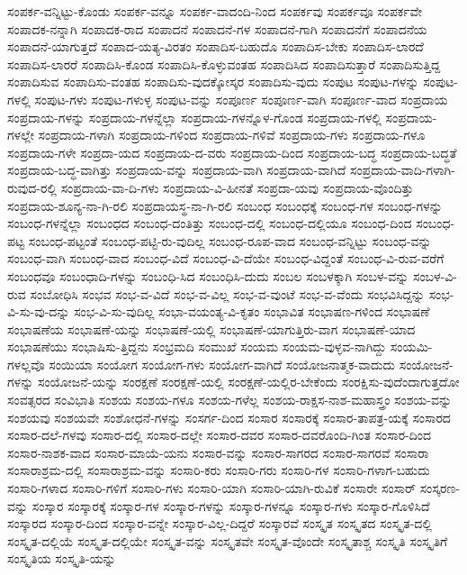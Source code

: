 {ಸಂಪರ್ಕ-ವನ್ನಿಟ್ಟು-ಕೊಂಡು
ಸಂಪರ್ಕ-ವನ್ನೂ
ಸಂಪರ್ಕ-ವಾದಂದಿ-ನಿಂದ
ಸಂಪರ್ಕವು
ಸಂಪರ್ಕವೂ
ಸಂಪರ್ಕವೇ
ಸಂಪಾದಕ-ನನ್ನಾಗಿ
ಸಂಪಾದಕ-ರಾದ
ಸಂಪಾದನೆ
ಸಂಪಾದನೆ-ಗಳ
ಸಂಪಾದನೆ-ಗಾಗಿ
ಸಂಪಾದನೆಗೆ
ಸಂಪಾದನೆಯ
ಸಂಪಾದನೆ-ಯಾಗುತ್ತದೆ
ಸಂಪಾದ-ಯತ್ಯ-ವಿರತಂ
ಸಂಪಾದಿಸ-ಬಹುದೊ
ಸಂಪಾದಿಸ-ಬೇಕು
ಸಂಪಾದಿಸ-ಲಾರದೆ
ಸಂಪಾದಿಸ-ಲಾರರೆ
ಸಂಪಾದಿಸಿ-ಕೊಂಡ
ಸಂಪಾದಿಸಿ-ಕೊಳ್ಳುವಂತಹ
ಸಂಪಾದಿಸಿದ
ಸಂಪಾದಿಸುತ್ತಾರೆ
ಸಂಪಾದಿಸುತ್ತಿದ್ದ
ಸಂಪಾದಿಸುವ
ಸಂಪಾದಿಸು-ವಂತಹ
ಸಂಪಾದಿಸು-ವುದಕ್ಕೋಸ್ಕರ
ಸಂಪಾದಿಸು-ವುದು
ಸಂಪುಟ
ಸಂಪುಟ-ಗಳನ್ನು
ಸಂಪುಟ-ಗಳಲ್ಲಿ
ಸಂಪುಟ-ಗಳು
ಸಂಪುಟ-ಗಳುಳ್ಳ
ಸಂಪುಟ-ವನ್ನು
ಸಂಪೂರ್ಣ
ಸಂಪೂರ್ಣ-ವಾಗಿ
ಸಂಪೂರ್ಣ-ವಾದ
ಸಂಪ್ರದಾಯ
ಸಂಪ್ರದಾಯ-ಗಳನ್ನು
ಸಂಪ್ರದಾಯ-ಗಳನ್ನೆಲ್ಲಾ
ಸಂಪ್ರದಾಯ-ಗಳನ್ನೊಳ-ಗೊಂಡ
ಸಂಪ್ರದಾಯ-ಗಳಲ್ಲಿ
ಸಂಪ್ರದಾಯ-ಗಳಲ್ಲೇ
ಸಂಪ್ರದಾಯ-ಗಳಾಗಿ
ಸಂಪ್ರದಾಯ-ಗಳಿಂದ
ಸಂಪ್ರದಾಯ-ಗಳಿವೆ
ಸಂಪ್ರದಾಯ-ಗಳು
ಸಂಪ್ರದಾಯ-ಗಳೂ
ಸಂಪ್ರದಾಯ-ಗಳೇ
ಸಂಪ್ರದಾ-ಯದ
ಸಂಪ್ರದಾಯ-ದ-ವರು
ಸಂಪ್ರದಾಯ-ದಿಂದ
ಸಂಪ್ರದಾಯ-ಬದ್ಧ
ಸಂಪ್ರದಾಯ-ಬದ್ಧತೆ
ಸಂಪ್ರದಾಯ-ಬದ್ಧ-ವಾಗಿತ್ತು
ಸಂಪ್ರದಾಯ-ವನ್ನು
ಸಂಪ್ರದಾಯ-ವಾಗಿ
ಸಂಪ್ರದಾಯ-ವಾಗಿದೆ
ಸಂಪ್ರದಾಯ-ವಾದಿ-ಗಳಾಗಿ-ರುವುದ-ರಲ್ಲಿ
ಸಂಪ್ರದಾಯ-ವಾ-ದಿ-ಗಳು
ಸಂಪ್ರದಾಯ-ವಿ-ಹೀನತೆ
ಸಂಪ್ರದಾ-ಯವು
ಸಂಪ್ರದಾಯ-ವೊಂದಿತ್ತು
ಸಂಪ್ರದಾಯ-ಶೂನ್ಯ-ನಾ-ಗಿ-ರಲಿ
ಸಂಪ್ರದಾಯಸ್ಥ-ನಾ-ಗಿ-ರಲಿ
ಸಂಬಂಧ
ಸಂಬಂಧಕ್ಕೆ
ಸಂಬಂಧ-ಗಳ
ಸಂಬಂಧ-ಗಳನ್ನು
ಸಂಬಂಧ-ಗಳನ್ನೆಲ್ಲಾ
ಸಂಬಂಧದ
ಸಂಬಂಧ-ದಂತಿತ್ತು
ಸಂಬಂಧ-ದಲ್ಲಿ
ಸಂಬಂಧ-ದಲ್ಲಿಯೂ
ಸಂಬಂಧ-ದಿಂದ
ಸಂಬಂಧ-ಪಟ್ಟ
ಸಂಬಂಧ-ಪಟ್ಟಂತೆ
ಸಂಬಂಧ-ಪಟ್ಟಿ-ರು-ವುದಿಲ್ಲ
ಸಂಬಂಧ-ರೂಪ-ವಾದ
ಸಂಬಂಧ-ವನ್ನಿಟ್ಟು
ಸಂಬಂಧ-ವನ್ನು
ಸಂಬಂಧ-ವಾಗಿ
ಸಂಬಂಧ-ವಾದ
ಸಂಬಂಧ-ವಿದೆ
ಸಂಬಂಧ-ವಿ-ದೆಯೇ
ಸಂಬಂಧ-ವಿದ್ದಂತೆ
ಸಂಬಂಧ-ವಿ-ರುವ-ವರೆಗೆ
ಸಂಬಂಧವೂ
ಸಂಬಂಧಾದಿ-ಗಳನ್ನು
ಸಂಬಂಧಿ-ಸಿದ
ಸಂಬಂಧಿಸಿ-ದುದು
ಸಂಬಲ
ಸಂಬಳಕ್ಕಾಗಿ
ಸಂಬಳ-ವನ್ನು
ಸಂಬಳ-ವಿ-ರುವ
ಸಂಬೋಧಿಸಿ
ಸಂಭವ
ಸಂಭ-ವ-ವಿದೆ
ಸಂಭ-ವ-ವಿಲ್ಲ
ಸಂಭ-ವ-ವುಂಟೆ
ಸಂಭ-ವ-ವೆಂದು
ಸಂಭವಿಸಿದ್ದನ್ನು
ಸಂಭ-ವಿ-ಸು-ವು-ದನ್ನು
ಸಂಭ-ವಿ-ಸು-ವುದಿಲ್ಲ
ಸಂಭಾ-ವಯಂತ್ಯ-ವಿ-ಕೃತಂ
ಸಂಭಾವಿತ
ಸಂಭಾಷಣ-ಗಳಿಂದ
ಸಂಭಾಷಣೆ
ಸಂಭಾಷಣೆಯ
ಸಂಭಾಷಣೆ-ಯನ್ನು
ಸಂಭಾಷಣೆ-ಯಲ್ಲಿ
ಸಂಭಾಷಣೆ-ಯಾಗುತ್ತಿರು-ವಾಗ
ಸಂಭಾಷಣೆ-ಯಾದ
ಸಂಭಾಷಣೆಯು
ಸಂಭಾಷಿಸು-ತ್ತಿದ್ದನು
ಸಂಭ್ರಮದಿ
ಸಂಮುಖೆ
ಸಂಯಮ
ಸಂಯಮ-ವುಳ್ಳವ-ನಾಗಿದ್ದು
ಸಂಯಮಿ-ಗಳಲ್ಲವೊ
ಸಂಯಿಯಾ
ಸಂಯೋಗ
ಸಂಯೋಗ-ಗಳು
ಸಂಯೋಗ-ವಾಗಿದೆ
ಸಂಯೋಜನಾತ್ಮಕ-ವಾದುದು
ಸಂಯೋಜನೆ-ಗಳನ್ನು
ಸಂಯೋಜನೆ-ಯನ್ನು
ಸಂರಕ್ಷಣೆ
ಸಂರಕ್ಷಣೆ-ಯಲ್ಲಿ
ಸಂರಕ್ಷಣೆ-ಯಲ್ಲಿರ-ಬೇಕೆಂದು
ಸಂರಕ್ಷಿಸು-ವುದೆಂದಾಗುತ್ತದೋ
ಸಂವತ್ಸರದ
ಸಂವಿಭಾತಿ
ಸಂಶಯ
ಸಂಶಯ-ಗಳೂ
ಸಂಶಯ-ಗಳೆಲ್ಲ
ಸಂಶಯ-ರಾಕ್ಷಸ-ನಾಶ-ಮಹಾಸ್ತ್ರಂ
ಸಂಶಯ-ವನ್ನು
ಸಂಶಯವು
ಸಂಶಯವೇ
ಸಂಶೋಧನೆ-ಗಳನ್ನು
ಸಂಸರ್ಗ-ದಿಂದ
ಸಂಸಾರ
ಸಂಸಾರಕ್ಕೆ
ಸಂಸಾರ-ತಾಪತ್ರ-ಯಕ್ಕೆ
ಸಂಸಾರದ
ಸಂಸಾರ-ದಲೆ-ಗಳವು
ಸಂಸಾರ-ದಲ್ಲಿ
ಸಂಸಾರ-ದಲ್ಲೇ
ಸಂಸಾರ-ದವರ
ಸಂಸಾರ-ದವರೊಂದಿ-ಗಿಂತ
ಸಂಸಾರ-ದಿಂದ
ಸಂಸಾರ-ನಾಶಕ-ವಾದ
ಸಂಸಾರ-ಮಾಯೆ-ಯನು
ಸಂಸಾರ-ವನ್ನು
ಸಂಸಾರ-ಸಾಗರದ
ಸಂಸಾರ-ಸಾಗರವೆ
ಸಂಸಾರಾ
ಸಂಸಾರಾಶ್ರಮ-ದಲ್ಲಿ
ಸಂಸಾರಾಶ್ರಮ-ವನ್ನು
ಸಂಸಾರಿ-ಕರು
ಸಂಸಾರಿ-ಗರು
ಸಂಸಾರಿ-ಗಳ
ಸಂಸಾರಿ-ಗಳಾಗ-ಬಹುದು
ಸಂಸಾರಿ-ಗಳಾದ
ಸಂಸಾರಿ-ಗಳಿಗೆ
ಸಂಸಾರಿ-ಗಳು
ಸಂಸಾರಿ-ಯಾಗಿ
ಸಂಸಾರಿ-ಯಾಗಿ-ರುವಿಕೆ
ಸಂಸಾರೇ
ಸಂಸಾರ್
ಸಂಸ್ಕರಣ-ವನ್ನು
ಸಂಸ್ಕಾರ
ಸಂಸ್ಕಾರಕ್ಕೆ
ಸಂಸ್ಕಾರ-ಗಳ
ಸಂಸ್ಕಾರ-ಗಳನ್ನು
ಸಂಸ್ಕಾರ-ಗಳನ್ನೂ
ಸಂಸ್ಕಾರ-ಗಳು
ಸಂಸ್ಕಾರ-ಗೊಳಿಸಿದೆ
ಸಂಸ್ಕಾರದ
ಸಂಸ್ಕಾರ-ದಿಂದ
ಸಂಸ್ಕಾರ-ವನ್ನೇ
ಸಂಸ್ಕಾರ-ವಿಲ್ಲ-ದಿದ್ದರೆ
ಸಂಸ್ಕಾರವೆ
ಸಂಸ್ಕೃತ
ಸಂಸ್ಕೃತದ
ಸಂಸ್ಕೃತ-ದಲ್ಲಿ
ಸಂಸ್ಕೃತ-ದಲ್ಲಿಯೆ
ಸಂಸ್ಕೃತ-ದಲ್ಲಿಯೇ
ಸಂಸ್ಕೃತ-ವನ್ನು
ಸಂಸ್ಕೃತವೇ
ಸಂಸ್ಕೃತ-ವೊಂದೇ
ಸಂಸ್ಕೃತಾಶ್ಚ
ಸಂಸ್ಕೃತಿ
ಸಂಸ್ಕೃತಿಗೆ
ಸಂಸ್ಕೃತಿಯ
ಸಂಸ್ಕೃತಿ-ಯನ್ನು
}
